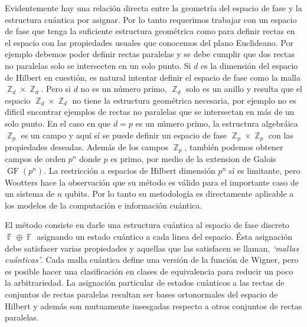 \documentclass[a4paper]{report}
\DeclareMathOperator{\Z}{\mathbb{Z}}
\DeclareMathOperator{\F}{\mathbb{F}}
\DeclareMathOperator{\GF}{GF}
\begin{document}
  Evidentemente hay una relación directa entre la geometría
  del espacio de fase y la estructura cuántica por asignar.
  Por lo tanto requerimos trabajar con un espacio de fase
  que tenga la suficiente estructura geométrica como para
  definir rectas en el espacio con las propiedades usuales
  que conocemos del plano Euclideano.  Por ejemplo debemos
  poder definir rectas paralelas y se debe cumplir que dos
  rectas no paralelas solo se intersecten en un solo punto.
  Si $d$ es la dimensión del espacio de Hilbert en cuestión,
  es natural intentar definir el espacio de fase como la
  malla $\Z_d \times \Z_d$. Pero si $d$ no es un número
  primo, $\Z_d$ solo es un anillo y resulta que el espacio
  $\Z_d \times \Z_d$ no tiene la estructura geométrica
  necesaria, por ejemplo no es dificil encontrar ejemplos de
  rectas no paralelas que se intersectan en más de un solo
  punto. En el caso en que $d = p$ es un número primo, la
  estructura algebráica $\Z_p$ es un campo y aquí sí se
  puede definir un espacio de fase $\Z_p \times \Z_p$ con
  las propiedades deseadas.  Además de los campos $\Z_p$,
  también podemos obtener campos de orden $p^{n}$ donde $p$
  es primo, por medio de la extension de Galois
  $\GF\left(p^{n}\right)$.  La restricción a espacios de
  Hilbert dimensión $p^{n}$ sí es limitante, pero Wootters
  hace la observación que su método es válido para el
  importante caso de un sistema de $n$ qubits. Por lo tanto
  su metodología es directamente aplicable a los modelos de
  la computación e información cuántica.

  El método consiste en darle una estructura cuántica al
  espacio de fase discreto $\F \oplus \F$ asignando un
  estado cuántico a cada linea del espacio.  Ésta asignación
  debe satisfacer varias propiedades y aquellas que las
  satisfacen se llaman, \textit{`mallas cuánticas'}. Cada
  malla cuántica define una versión de la función de Wigner,
  pero es posible hacer una clasificación en clases de
  equivalencia para reducir un poco la arbitrariedad. La
  asignación particular de estados cuánticos a las rectas de
  conjuntos de rectas paralelas resultan ser bases
  ortonormales del espacio de Hilbert y además son
  mutuamente insesgadas respecto a otros conjuntos de rectas
  paralelas.
\end{document}
